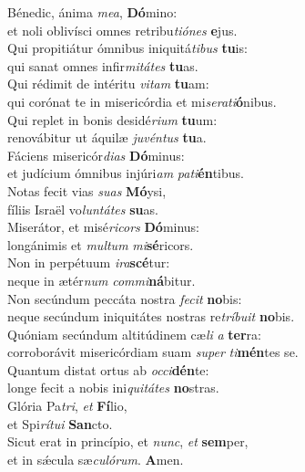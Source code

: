 \evenverse Bénedic, ánima \textit{me}\textit{a}, \textbf{Dó}mino:~\*\\
\evenverse et noli oblivísci omnes retribu\textit{ti}\textit{ó}\textit{nes} \textbf{e}jus.\\
\oddverse Qui propitiátur ómnibus iniquitá\textit{ti}\textit{bus} \textbf{tu}is:~\*\\
\oddverse qui sanat omnes infir\textit{mi}\textit{tá}\textit{tes} \textbf{tu}as.\\
\evenverse Qui rédimit de intéritu \textit{vi}\textit{tam} \textbf{tu}am:~\*\\
\evenverse qui corónat te in misericórdia et mi\textit{se}\textit{ra}\textit{ti}\textbf{ó}nibus.\\
\oddverse Qui replet in bonis desidé\textit{ri}\textit{um} \textbf{tu}um:~\*\\
\oddverse renovábitur ut áquilæ \textit{ju}\textit{vén}\textit{tus} \textbf{tu}a.\\
\evenverse Fáciens misericór\textit{di}\textit{as} \textbf{Dó}minus:~\*\\
\evenverse et judícium ómnibus injúri\textit{am} \textit{pa}\textit{ti}\textbf{én}tibus.\\
\oddverse Notas fecit vias \textit{su}\textit{as} \textbf{Mó}ysi,~\*\\
\oddverse fíliis Israël vo\textit{lun}\textit{tá}\textit{tes} \textbf{su}as.\\
\evenverse Miserátor, et misé\textit{ri}\textit{cors} \textbf{Dó}minus:~\*\\
\evenverse longánimis et \textit{mul}\textit{tum} \textit{mi}\textbf{sé}ricors.\\
\oddverse Non in perpétuum \textit{i}\textit{ra}\textbf{scé}tur:~\*\\
\oddverse neque in ætér\textit{num} \textit{com}\textit{mi}\textbf{ná}bitur.\\
\evenverse Non secúndum peccáta nostra \textit{fe}\textit{cit} \textbf{no}bis:~\*\\
\evenverse neque secúndum iniquitátes nostras re\textit{trí}\textit{bu}\textit{it} \textbf{no}bis.\\
\oddverse Quóniam secúndum altitúdinem cæ\textit{li} \textit{a} \textbf{ter}ra:~\*\\
\oddverse corroborávit misericórdiam suam \textit{su}\textit{per} \textit{ti}\textbf{mén}tes se.\\
\evenverse Quantum distat ortus ab \textit{oc}\textit{ci}\textbf{dén}te:~\*\\
\evenverse longe fecit a nobis ini\textit{qui}\textit{tá}\textit{tes} \textbf{no}stras.\\
\oddverse Glória Pa\textit{tri}, \textit{et} \textbf{Fí}lio,~\*\\
\oddverse et Spi\textit{rí}\textit{tu}\textit{i} \textbf{San}cto.\\
\evenverse Sicut erat in princípio, et \textit{nunc}, \textit{et} \textbf{sem}per,~\*\\
\evenverse et in sǽcula sæ\textit{cu}\textit{ló}\textit{rum}. \textbf{A}men.\\
